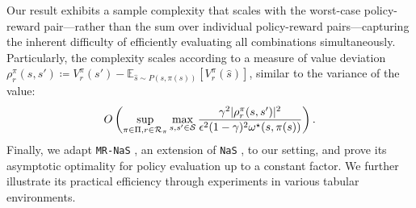Our result exhibits a sample complexity that scales with the worst-case policy-reward pair—rather than the sum over individual policy-reward pairs—capturing the inherent difficulty of efficiently evaluating all combinations simultaneously. Particularly, the complexity scales according to a measure of value deviation $\rho_r^\pi(s,s')\coloneqq V_r^\pi(s') - \mathbb{E}_{\hat s \sim P(s,\pi(s))}[V_r^\pi(\hat s)]$, similar to the variance of the value:
\[
O\left(\sup_{\pi\in \Pi,r\in {\cal R}_\pi} \max_{s,s'\in{\cal S}} \frac{ \gamma^2|\rho_r^\pi(s,s')|^2}{\epsilon^2 (1-\gamma)^2 \omega^\star(s,\pi(s))}\right).
\]
Finally, we adapt {\tt MR-NaS} \cite{russomulti}, an extension of {\tt NaS} \cite{al2021navigating}, to our setting, and prove its asymptotic optimality for policy evaluation up to a constant factor. We further illustrate its practical efficiency through experiments in various  tabular environments.





